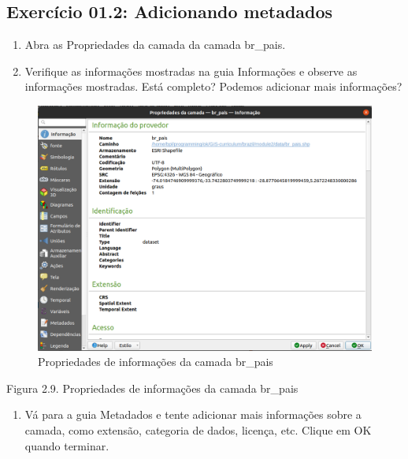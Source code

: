 \documentclass[
  portuguese,
]{krantz}
\providecommand{\tightlist}{%
  \setlength{\itemsep}{0pt}\setlength{\parskip}{0pt}}
\begin{document}
\hypertarget{exercuxedcio-01.2-adicionando-metadados}{%
\subsection{\texorpdfstring{\textbf{Exercício 01.2: Adicionando metadados}}{Exercício 01.2: Adicionando metadados}}\label{exercuxedcio-01.2-adicionando-metadados}}

\begin{enumerate}
\def\labelenumi{\arabic{enumi}.}
\tightlist
\item
  Abra as Propriedades da camada da camada br\_pais.
\item
  Verifique as informações mostradas na guia Informações e observe as informações mostradas. Está completo? Podemos adicionar mais informações?
\end{enumerate}

\begin{figure}
\centering
\includegraphics{media/modulo2/metadata-1.png}
\caption{Propriedades de informações da camada br\_pais}
\end{figure}

Figura 2.9. Propriedades de informações da camada br\_pais

\begin{enumerate}
\def\labelenumi{\arabic{enumi}.}
\setcounter{enumi}{2}
\tightlist
\item
  Vá para a guia Metadados e tente adicionar mais informações sobre a camada, como extensão, categoria de dados, licença, etc. Clique em OK quando terminar.
\end{enumerate}
\end{document}

